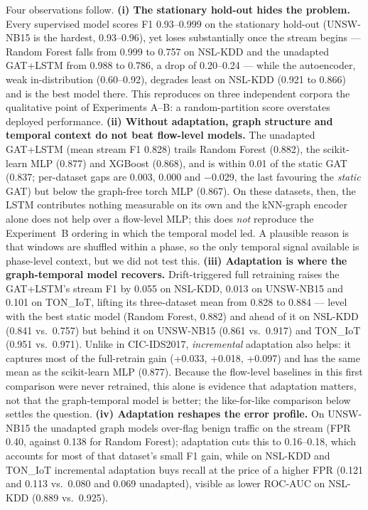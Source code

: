 \documentclass[twocolumn]{llncs}
\begin{document}
Four observations follow. \textbf{(i) The stationary hold-out hides the problem.} Every supervised
model scores F1 0.93--0.999 on the stationary hold-out (UNSW-NB15 is the hardest, 0.93--0.96), yet
loses substantially once the stream begins --- Random Forest falls from 0.999 to 0.757 on NSL-KDD
and the unadapted GAT+LSTM from 0.988 to 0.786, a drop of 0.20--0.24 --- while the autoencoder, weak
in-distribution (0.60--0.92), degrades least on NSL-KDD (0.921 to 0.866) and is the best model
there. This reproduces on three independent corpora the qualitative point of Experiments A--B: a
random-partition score overstates deployed performance.
\textbf{(ii) Without adaptation, graph structure and temporal context do not beat flow-level
models.} The unadapted GAT+LSTM (mean stream F1 0.828) trails Random Forest (0.882), the
scikit-learn MLP (0.877) and XGBoost (0.868), and is within 0.01 of the static GAT
(0.837; per-dataset gaps are 0.003, 0.000 and $-$0.029, the last favouring the \emph{static} GAT)
but below the graph-free torch MLP (0.867). On these datasets, then, the LSTM contributes nothing
measurable on its own and the kNN-graph encoder alone does not help over a flow-level MLP; this
does \emph{not} reproduce the Experiment~B ordering in which the temporal model led. A plausible
reason is that windows are shuffled within a phase, so the only temporal signal available is
phase-level context, but we did not test this.
\textbf{(iii) Adaptation is where the graph-temporal model recovers.} Drift-triggered full
retraining raises the GAT+LSTM's stream F1 by 0.055 on NSL-KDD, 0.013 on UNSW-NB15 and 0.101 on
TON\_IoT, lifting its three-dataset mean from 0.828 to 0.884 --- level with the best static model
(Random Forest, 0.882) and ahead of it on NSL-KDD (0.841 vs.\ 0.757) but behind it on
UNSW-NB15 (0.861 vs.\ 0.917) and TON\_IoT (0.951 vs.\ 0.971). Unlike in CIC-IDS2017,
\emph{incremental} adaptation also helps: it captures most of the full-retrain gain
(+0.033, +0.018, +0.097) and has the same mean as the scikit-learn MLP (0.877). Because the flow-level baselines in this first comparison were never retrained, this alone
is evidence that adaptation matters, not that the graph-temporal model is better; the
like-for-like comparison below settles the question. \textbf{(iv) Adaptation reshapes the error profile.} On
UNSW-NB15 the unadapted graph models over-flag benign traffic on the stream (FPR 0.40, against
0.138 for Random Forest); adaptation cuts this to 0.16--0.18, which accounts for most of that
dataset's small F1 gain, while on NSL-KDD and TON\_IoT incremental adaptation buys recall at the
price of a higher FPR (0.121 and 0.113 vs.\ 0.080 and 0.069 unadapted), visible as lower ROC-AUC on
NSL-KDD (0.889 vs.\ 0.925).
\end{document}
